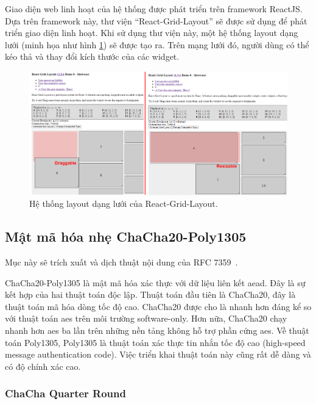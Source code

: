 Giao diện web linh hoạt của hệ thống được phát triển trên framework ReactJS. Dựa trên framework này, thư viện ``React-Grid-Layout'' sẽ được sử dụng để phát triển giao diện linh hoạt. Khi sử dụng thư viện này, một hệ thống layout dạng lưới (minh họa như hình \ref{fig:RGL-overview}) sẽ được tạo ra. Trên mạng lưới đó, người dùng có thể kéo thả và thay đổi kích thước của các widget.

\begin{figure}[htp]
\centering
\includegraphics[width=1.0\linewidth]{images/Thesis-Page-7-RGL-Overview.png}
\caption{Hệ thống layout dạng lưới của React-Grid-Layout.}
\label{fig:RGL-overview}
\end{figure}

\subsection{Mật mã hóa nhẹ ChaCha20-Poly1305}

Mục này sẽ trích xuất và dịch thuật nội dung của RFC 7359~\cite{rfc7539}.

ChaCha20-Poly1305 là mật mã hóa xác thực với dữ liệu liên kết \acrfull{aead}. Đây là sự kết hợp của hai thuật toán độc lập. Thuật toán đầu tiên là ChaCha20, đây là thuật toán mã hóa dòng tốc độ cao. ChaCha20 được cho là nhanh hơn đáng kể so với thuật toán \acrfull{aes} trên môi trường software-only. Hơn nữa, ChaCha20 chạy nhanh hơn \acrshort{aes} ba lần trên những nền tảng không hỗ trợ phần cứng \acrshort{aes}. Về thuật toán Poly1305, Poly1305 là thuật toán xác thực tin nhắn tốc độ cao (high-speed message authentication code). Việc triển khai thuật toán này cũng rất dễ dàng và có độ chính xác cao.

\subsubsection{ChaCha Quarter Round}

